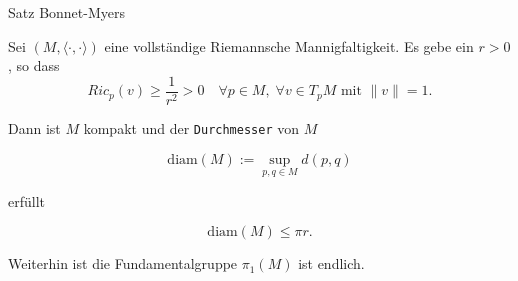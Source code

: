 \documentclass[a6paper,11pt,grid=front]{kartei}
\newcommand{\fl}[1]{\begin{flushleft}
 #1 \end{flushleft}}
\newcommand{\blf}[1]{\langle #1 \rangle}
\begin{document}
\nonameyet
{Satz} {Bonnet-Myers}
{
\small
Sei $(M,\blf{\cdot,\cdot})$ eine vollständige Riemannsche Mannigfaltigkeit. 
Es gebe ein $r > 0$, so dass
\[
Ric_p(v) \geq \frac{1}{r^2} > 0 
\quad \forall p\in M,
\; \forall v\in T_pM \text{ mit } \|v\| = 1.
\]
\fl{Dann ist $M$ kompakt und der \texttt{Durchmesser} von $M$}
\[
\text{diam}(M) := \sup_{p,q \in M} d(p,q) 
\]
\fl{erfüllt }
\[
\text{diam}(M) \leq \pi r.
\]
\fl{Weiterhin ist die Fundamentalgruppe $\pi_1(M)$ ist endlich.}
}
{}
\end{document}
